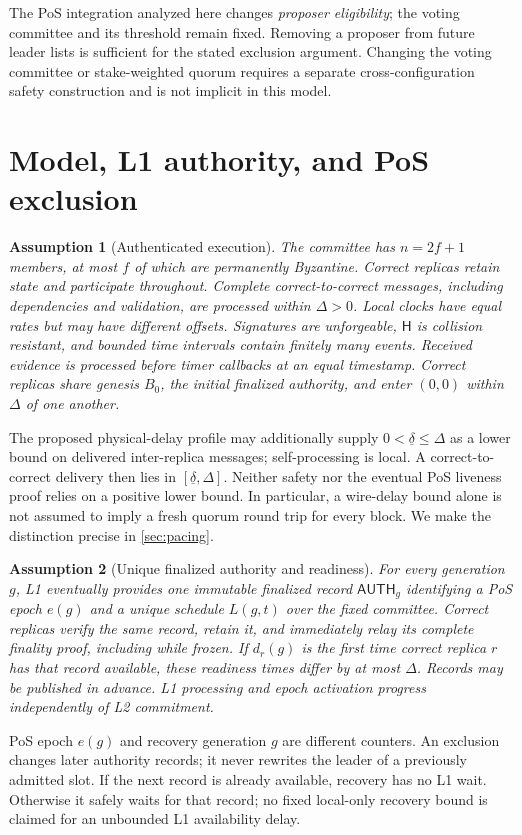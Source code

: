 \documentclass[11pt,a4paper]{article}
\newcommand{\Hash}{\mathsf H}
\newcommand{\tagg}[1]{\mathsf{#1}}
\newtheorem{assumption}[assumption]{Assumption}
\begin{document}
The PoS integration analyzed here changes \emph{proposer eligibility};
the voting committee and its threshold remain fixed. Removing a proposer
from future leader lists is sufficient for the stated exclusion argument.
Changing the voting committee or stake-weighted quorum requires a separate
cross-configuration safety construction and is not implicit in this model.

\section{Model, L1 authority, and PoS exclusion}
\label{sec:model}
\begin{assumption}[Authenticated execution]
\label{ass:network}
The committee has $n=2f+1$ members, at most $f$ of which are permanently
Byzantine. Correct replicas retain state and participate throughout.
Complete correct-to-correct messages, including dependencies and validation,
are processed within $\Delta>0$. Local clocks have equal rates but may
have different offsets. Signatures are unforgeable, $\Hash$ is collision
resistant, and bounded time intervals contain finitely many events.
Received evidence is processed before timer callbacks at an equal timestamp.
Correct replicas share genesis $B_0$, the initial finalized authority,
and enter $(0,0)$ within $\Delta$ of one another.
\end{assumption}

The proposed physical-delay profile may additionally supply
$0<\underline\delta\le\Delta$ as a lower bound on delivered inter-replica
messages; self-processing is local. A correct-to-correct delivery then
lies in $[\underline\delta,\Delta]$. Neither safety nor the eventual PoS
liveness proof relies on a positive lower bound. In particular, a wire-delay
bound alone is not assumed to imply a fresh quorum round trip for every
block. We make the distinction precise in \cref{sec:pacing}.

\begin{assumption}[Unique finalized authority and readiness]
\label{ass:l1}
For every generation $g$, L1 eventually provides one immutable finalized
record $\tagg{AUTH}_g$ identifying a PoS epoch $e(g)$ and a unique schedule
$L(g,t)$ over the fixed committee. Correct replicas verify the same
record, retain it, and immediately relay its complete finality proof,
including while frozen. If $d_r(g)$ is the first time correct replica $r$
has that record available, these readiness times differ by at most $\Delta$.
Records may be published in advance. L1 processing and epoch activation
progress independently of L2 commitment.
\end{assumption}
PoS epoch $e(g)$ and recovery generation $g$ are different counters.
An exclusion changes later authority records; it never rewrites the
leader of a previously admitted slot. If the next record is already
available, recovery has no L1 wait. Otherwise it safely waits for that
record; no fixed local-only recovery bound is claimed for an unbounded
L1 availability delay.
\end{document}
